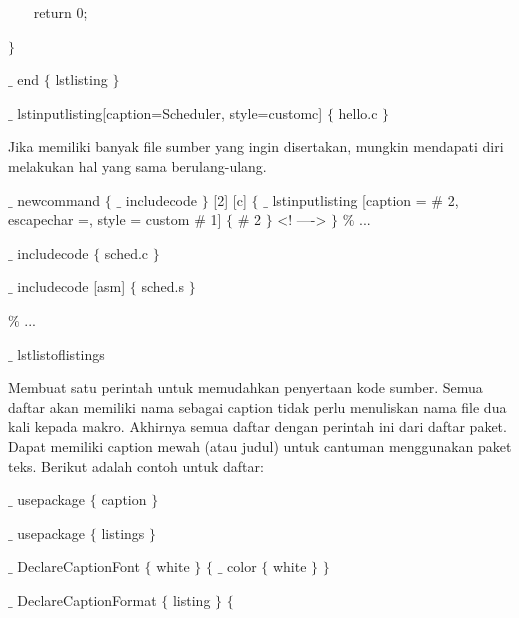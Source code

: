 {\fontsize{10pt}{10pt}\selectfont ~~~ return 0;}\par

{\fontsize{10pt}{10pt}\selectfont  $ \} $ }\par

{\fontsize{10pt}{10pt}\selectfont  $ \_ $ end $ \{ $ lstlisting $ \} $ }\par

{\fontsize{10pt}{10pt}\selectfont  $ \_ $ lstinputlisting[caption=Scheduler, style=customc] $ \{ $ hello.c $ \} $ }\par

\vspace{12pt}
\hspace{0.50in} Jika memiliki banyak file sumber yang ingin disertakan, mungkin mendapati diri melakukan hal yang sama berulang-ulang. 

$ \_ $  newcommand  $ \{ $  $ \_ $  includecode $ \} $  [2] [c]  $ \{ $  $ \_ $  lstinputlisting [caption =  $\#$  2, escapechar =, style = custom  $\#$  1]  $ \{ $  $\#$  2 $ \} $  <! ----> $ \} $  $\%$  ... 

$ \_ $  includecode  $ \{ $ sched.c $ \} $ 

$ \_ $  includecode [asm]  $ \{ $ sched.s $ \} $ 

$\%$  ... 

$ \_ $  lstlistoflistings

\vspace{12pt}
\hspace{0.50in} Membuat satu perintah untuk memudahkan penyertaan kode sumber. Semua daftar akan memiliki nama  sebagai caption tidak perlu menuliskan nama file dua kali kepada makro. Akhirnya semua daftar dengan perintah ini dari daftar paket. Dapat memiliki caption mewah (atau judul) untuk cantuman menggunakan paket teks. Berikut adalah contoh untuk daftar:\par

{\fontsize{10pt}{10pt}\selectfont  $ \_ $ usepackage $ \{ $ caption $ \} $ }\par

{\fontsize{10pt}{10pt}\selectfont  $ \_ $ usepackage $ \{ $ listings $ \} $ }\par

{\fontsize{10pt}{10pt}\selectfont  $ \_ $ DeclareCaptionFont $ \{ $ white $ \} $  $ \{ $   $ \_ $ color $ \{ $ white $ \} $   $ \} $ }\par

{\fontsize{10pt}{10pt}\selectfont  $ \_ $ DeclareCaptionFormat $ \{ $ listing $ \} $  $ \{ $ }\par

